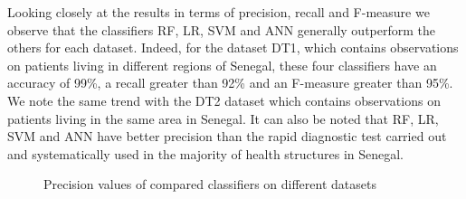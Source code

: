  Looking closely at the results in terms of precision, recall and F-measure we observe that the classifiers RF, LR, SVM and ANN generally outperform the others for each dataset. Indeed, for the dataset DT1, which contains observations on patients living in different regions of Senegal, these four classifiers have an accuracy of 99\%, a recall greater than 92\% and an F-measure greater than 95\%. We note the same trend with the DT2 dataset which contains observations on patients living in the same area in Senegal. It can also be noted that RF, LR, SVM and ANN have better precision than the rapid diagnostic test carried out and systematically used in the majority of health structures in Senegal. 

\begin{figure}[!h]
\caption{Precision values of compared classifiers on different datasets}
\end{figure}


